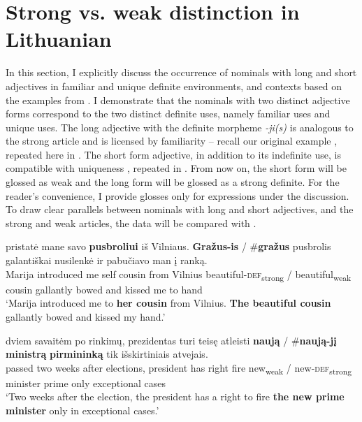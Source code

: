 \documentclass[output=paper,
modfonts
]{langscibook}
\begin{document}
\section{Strong vs. weak distinction in Lithuanian} \label{sec:sereikaite:4}

In this section, I explicitly discuss the occurrence of  nominals with long and short adjectives in familiar and unique definite environments, and  contexts based on the examples from \citet{Schwarz2009}. I demonstrate that the nominals with two distinct adjective forms correspond to the two distinct definite uses, namely familiar uses and unique uses. The long adjective with the definite morpheme \textit{-ji(s)} is analogous to the  strong article and is licensed by familiarity -- recall our original example , repeated here in . The short form adjective, in addition to its indefinite use, is compatible with uniqueness , repeated in . From now on, the short form will be glossed as weak and the long form will be glossed as a strong definite. For the reader's convenience, I provide glosses only for expressions under the discussion. To draw clear parallels between nominals with long and short adjectives, and the strong and weak articles, the  data will be compared with . 

\begin{exe}
	\ex \label{ex:sereikaite:27}
	 {pristatė} {mane} {savo} {\textbf{pusbroliui}} {iš} {Vilniaus}. \textbf{Gražus-is} \textnormal{/} \textnormal{\#}\textbf{gražus} {pusbrolis} {galantiškai} {nusilenkė} {ir} {pabučiavo} {man} {į} {ranką}.\\
	Marija introduced me self {cousin} from Vilnius {beautiful-\textsc{def}\textsubscript{strong}} / {\phantom{\#}beautiful\textsubscript{weak}} cousin gallantly bowed and kissed me to hand \\
	\trans `Marija introduced me to \textbf{her cousin} from Vilnius. \textbf{The beautiful cousin} gallantly bowed and kissed my hand.'
\end{exe}

\begin{exe}
	\ex \label{ex:sereikaite:28}
	 {dviem} {savaitėm} {po} {rinkimų}, {prezidentas} {turi} {teisę} {atleisti} \textbf{naują} \textnormal{/} \textnormal{\#}\textbf{naują-jį} \textbf{{ministrą}} \textbf{{pirmininką}} {tik} {išskirtiniais} {atvejais}.\\
	passed two weeks after elections, president has right fire {new\textsubscript{weak}} / {\phantom{\#}new-\textsc{def}\textsubscript{strong}} {minister} {prime} only exceptional cases\\
	\trans `Two weeks after the election, the president has a right to fire \textbf{the new prime minister} only in exceptional cases.' 
\end{exe}
\end{document}

